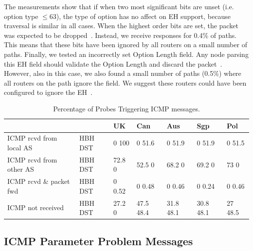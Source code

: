 \documentclass[conference]{IEEEtran}
\begin{document}
The measurements show that if when two most significant bits are unset (i.e. option type
$\le 63$), the type of option has no affect on EH support, because traversal 
is similar in all cases. When the highest order bits are set, the
packet was expected to be dropped~\cite{RFC8200}.  Instead, we receive
responses for 0.4\% of paths. This means that these bits have been ignored by all
routers on a small number of paths.
Finally, we tested an incorrectly set Option Length field. Any node parsing
this EH field should validate the Option Length and discard the
packet~\cite{RFC8200}. However, also in this case, we also found a small number of
paths (0.5\%) where all routers on the path ignore the field. We suggest
these routers could have been configured to ignore the EH~\cite{RFC8200}.

\begin{table}[t]
\centering
\caption{Percentage of Probes Triggering ICMP messages.}
\label{tbl:icmp_support_dst}
\begin{tabular}{l|p{}|
p{}|p{}|p{}|p{}|p{}}
                           &          & UK        & Can       & Aus    & Sgp          & Pol     \\
\hline
\hline
{ICMP rcvd from local AS}  & {HBH DST} & {0 100}  & {0 51.6}    & {0 51.9}    & {0 51.9}    & {0 51.5}  \\
\hline
{ICMP rcvd from other AS} & {HBH DST} & {72.8 0} & {52.5 0}    & {68.2 0}    & {69.2 0}    & {73  0}   \\
\hline
{ICMP rcvd \& packet fwd} & {HBH DST} & {0 0.52} & {0 0.48}    & {0 0.46}    & {0 0.24}    & {0 0.46}  \\
\hline
{ICMP not received}        & {HBH DST} & {27.2 0} & {47.5 48.4} & {31.8 48.1} & {30.8 48.1} & {27 48.5} 
\end{tabular}
\end{table}


\subsection{ICMP Parameter Problem Messages}

\end{document}
